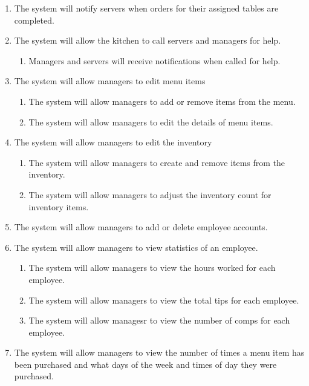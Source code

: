 \documentclass[12pt]{article}
\begin{document}
\begin{enumerate}
			\item The system will notify servers when orders for their assigned tables are completed.

			\item The system will allow the kitchen to call servers and managers for help.
				\begin{enumerate}
					\item Managers and servers will receive notifications when called for help.
				\end{enumerate}

			\item The system will allow managers to edit menu items
				\begin{enumerate}
					\item The system will allow managers to add or remove items from the menu.
					\item The system will allow managers to edit the details of menu items.
				\end{enumerate}

			\item The system will allow managers to edit the inventory
				\begin{enumerate}
					\item The system will allow managers to create and remove items from the inventory.
					\item The system will allow managers to adjust the inventory count for inventory items.
				\end{enumerate}

			\item The system will allow managers to add or delete employee accounts.

			\item The system will allow managers to view statistics of an employee.
				\begin{enumerate}
					\item The system will allow managers to view the hours worked for each employee.
					\item The system will allow managers to view the total tips for each employee.
					\item The system will allow managesr to view the number of comps for each employee.
				\end{enumerate}

			\item The system will allow managers to view the number of times a menu item has been purchased and what days of the week and times of day they were purchased.


\end{enumerate}
\end{document}
